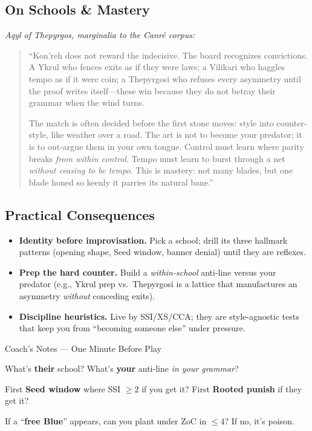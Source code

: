 \documentclass[11pt]{article}
\newenvironment{coachnotes}[1]{%
  \begin{coachbox}{#1}%
    \footnotesize
    \begin{description}[leftmargin=2.8cm,labelsep=0.6em,font=\scshape,
                        itemsep=0.25em,parsep=0pt,topsep=0.2em]
}{%
    \end{description}%
  \end{coachbox}%
}
\newcommand{\CNRow}[2]{\item[#1] #2}
\begin{document}
\subsection*{On Schools \& Mastery}
\noindent\textit{Aqyl of Thepyrgos, marginalia to the Canré corpus:}
\begin{quote}\small
“Kon'reh does not reward the indecisive. The board recognizes convictions. A Ykrul who fences exits as if they were laws; a Vilikari who haggles tempo as if it were coin; a Thepyrgosi who refuses every asymmetry until the proof writes itself—these win because they do not betray their grammar when the wind turns. 

The match is often decided before the first stone moves: style into counter-style, like weather over a road. The art is not to become your predator; it is to out-argue them in your own tongue. Control must learn where parity breaks \emph{from within control}. Tempo must learn to burst through a net \emph{without ceasing to be tempo}. This is mastery: not many blades, but one blade honed so keenly it parries its natural bane.” 
\end{quote}


\subsection*{Practical Consequences}
\begin{itemize}
  \item \textbf{Identity before improvisation.} Pick a school; drill its three hallmark patterns (opening shape, Seed window, banner denial) until they are reflexes.
  \item \textbf{Prep the hard counter.} Build a \emph{within-school} anti-line versus your predator (e.g., Ykrul prep vs.\ Thepyrgosi is a lattice that manufactures an asymmetry \emph{without} conceding exits).
  \item \textbf{Discipline heuristics.} Live by SSI/XS/CCA; they are style-agnostic tests that keep you from “becoming someone else” under pressure.
\end{itemize}


\begin{coachnotes}{Coach’s Notes — One Minute Before Play}
  \CNRow{School read}{What’s \textbf{their} school? What’s \textbf{your} anti-line \emph{in your grammar}?}
  \CNRow{Seed windows}{First \textbf{Seed window} where SSI $\ge 2$ if you get it? First \textbf{Rooted punish} if they get it?}
  \CNRow{Free Blue test}{If a “\textbf{free Blue}” appears, can you plant under ZoC in $\le 4$? If no, it’s poison.}
\end{coachnotes}
\end{document}
